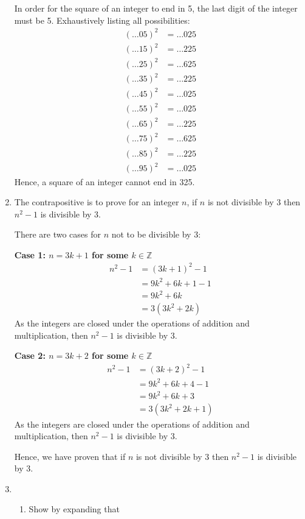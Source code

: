\documentclass[11pt, a4paper, oneside]{exam}
\theoremstyle{definition}\newtheorem{define}{Definition}[section]
\theoremstyle{remark}\newtheorem{remark}{Remark}
\theoremstyle{definition}\newtheorem{example}{Example}[subsection]
\theoremstyle{definition}\newtheorem{notation}{Notation}[section]
\theoremstyle{definition}\newtheorem{theorem}{Theorem}[section]
\theoremstyle{definition}\newtheorem{corollary}{Corollary}[section]
\begin{document}
\begin{enumerate}
In order for the square of an integer to end in 5, the last digit of the integer must be 5. Exhaustively listing all possibilities:
\begin{align*}
(\ldots05)^2 & = \ldots025\\
(\ldots15)^2 & = \ldots225\\
(\ldots25)^2 & = \ldots625\\
(\ldots35)^2 & = \ldots225\\
(\ldots45)^2 & = \ldots025\\
(\ldots55)^2 & = \ldots025\\
(\ldots65)^2 & = \ldots225\\
(\ldots75)^2 & = \ldots625\\
(\ldots85)^2 & = \ldots225\\
(\ldots95)^2 & = \ldots025
\end{align*}
Hence, a square of an integer cannot end in 325.



\item The contrapositive is to prove for an integer $n$, if $n$ is not divisible by 3 then $n^2-1$ is divisible by 3.

There are two cases for $n$ not to be divisible by 3:

\textbf{Case 1: $n = 3k +1$ for some $k \in \mathbb{Z}$}
\begin{align*}
n^2 -1 & = (3k+1)^2 - 1\\
& = 9k^2 + 6k + 1 -1 \\
& = 9k^2 + 6k\\
& = 3(3k^2 + 2k)
\end{align*}
As the integers are closed under the operations of addition and multiplication, then $n^2-1$ is divisible by 3.

\textbf{Case 2: $n = 3k +2$ for some $k \in \mathbb{Z}$}
\begin{align*}
n^2 -1 & = (3k+2)^2 - 1\\
& = 9k^2 + 6k + 4 -1 \\
& = 9k^2 + 6k + 3\\
& = 3(3k^2 + 2k + 1)
\end{align*}
As the integers are closed under the operations of addition and multiplication, then $n^2-1$ is divisible by 3.

Hence, we have proven that if $n$ is not divisible by 3 then $n^2-1$ is divisible by 3.

\item 
\begin{enumerate}
\item Show by expanding that 


\end{enumerate}
\end{enumerate}
\end{document}
